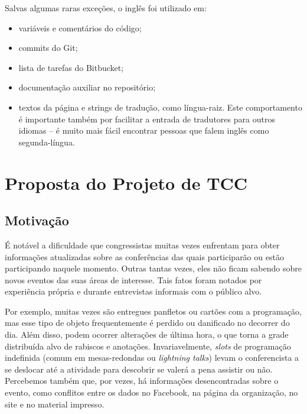 \documentclass[12pt,a4paper,twoside,hyphens,english,brazil]{abntex2}
\begin{document}
\begin{KeepFromToc}
Salvas algumas raras exceções, o inglês foi utilizado em:
\begin{itemize}
	\item variáveis e comentários do código;
	\item commits do Git;
	\item lista de tarefas do Bitbucket;
	\item documentação auxiliar no repositório;
	\item textos da página e strings de tradução, como língua-raiz. Este comportamento é importante também por facilitar a entrada de tradutores para outros idiomas -- é muito mais fácil encontrar pessoas que falem inglês como segunda-língua.
\end{itemize}

\end{KeepFromToc}

\textual

\chapter{Proposta do Projeto de TCC}

\section{Motivação}

É notável a dificuldade que congressistas muitas vezes enfrentam para obter informações atualizadas sobre as conferências das quais participarão ou estão participando naquele momento. Outras tantas vezes, eles não ficam sabendo sobre novos eventos das suas áreas de interesse. Tais fatos foram notados por experiência própria e durante entrevistas informais com o público alvo.

Por exemplo, muitas vezes são entregues panfletos ou cartões com a programação, mas esse tipo de objeto frequentemente é perdido ou danificado no decorrer do dia. Além disso, podem ocorrer alterações de última hora, o que torna a grade distribuída alvo de rabiscos e anotações. Invariavelmente, \emph{slots} de programação indefinida (comum em mesas-redondas ou \emph{lightning talks}\footnotemark) levam o conferencista a se deslocar até a atividade para descobrir se valerá a pena assistir ou não. Percebemos também que, por vezes, há informações desencontradas sobre o evento, como conflitos entre os dados no Facebook, na página da organização, no site e no material impresso.
\end{document}
